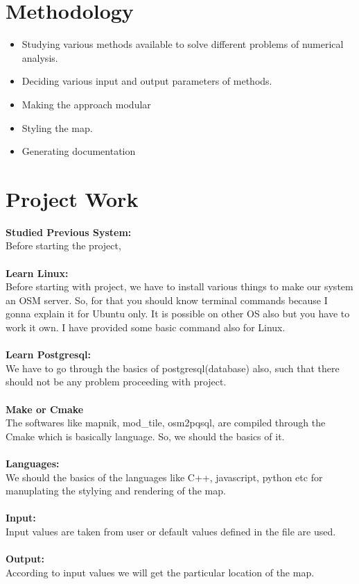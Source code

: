 \section{Methodology}
\begin{itemize}
\item Studying various methods available to solve different problems of numerical analysis.
\item Deciding various input and output parameters of methods.
\item Making the approach modular 
\item Styling the map.
\item Generating documentation
\end{itemize}

\section{Project Work} 
\textbf{Studied Previous System:}\\
Before starting the project, \\\\
\textbf{Learn Linux:}\\
Before starting with project, we have to install various things to make our system an OSM server. So, for that you should know terminal commands because I gonna explain it for Ubuntu only. It is possible on other OS also but you have to work it own. I have provided some basic command also for Linux. \\\\
\textbf{Learn Postgresql:}\\
 We have to go through the basics of postgresql(database) also, such that there
should not be any problem proceeding with project.\\\\
\textbf{Make or Cmake}\\
The softwares like mapnik, mod\_tile, osm2pqsql, are compiled through the Cmake which is basically language. So, we should the basics of it.
\\\\
\textbf{Languages:}\\
We should the basics of the languages like C++, javascript, python etc for manuplating the stylying and rendering of the map.\\\\
\textbf{Input:}\\
Input values are taken from user or default values defined in the file are used.\\\\
\textbf{Output:}\\
According to input values we will get the particular location of the map.

